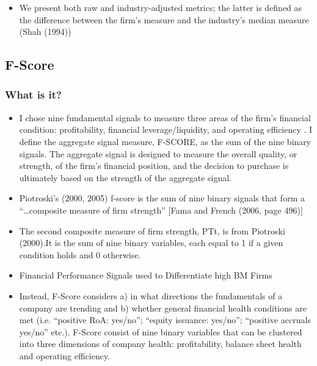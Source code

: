 \documentclass[12pt]{article}
\begin{document}
\begin{itemize}
            \item We present both raw and industry-adjusted metrics; the latter is defined as the difference between the firm’s measure and the industry’s median measure (Shah (1994)) \citep{Klein2009}
        \end{itemize}

\subsection{F-Score}

    \subsubsection{What is it?}

        \begin{itemize}

            \item I chose nine fundamental signals to measure three areas of the firm's financial condition: profitability, financial leverage/liquidity, and operating efficiency \citep{Piotroski2000}. I define the aggregate signal measure, F-SCORE, as the sum of the nine binary signals. The aggregate signal is designed to measure the overall quality, or strength, of the firm's financial position, and the decision to purchase is ultimately based on the strength of the aggregate signal.

            \item Piotroski’s (2000, 2005) f-score is the sum of nine binary signals that form a “…composite measure of firm strength” [Fama and French (2006, page 496)] \citep{Choi2012}

            \item The second composite measure of firm strength, PTt, is from Piotroski (2000).It is the sum of nine binary variables, each equal to 1 if a given condition holds and 0 otherwise.\citep{Fama2006}

            \item Financial Performance Signals used to Differentiate high BM Firms \citep{Piotroski2000}

            \item Instead, F-Score considers a) in what directions the fundamentals of a company are trending and b) whether general financial health conditions are met (i.e. “positive RoA: yes/no”; “equity issuance: yes/no”; “positive accruals yes/no” etc.). F-Score consist of nine binary variables that can be clustered into three dimensions of company health: profitability, balance sheet health and operating efficiency.\citep{Mohr2012}
        

\end{itemize}
\end{document}
